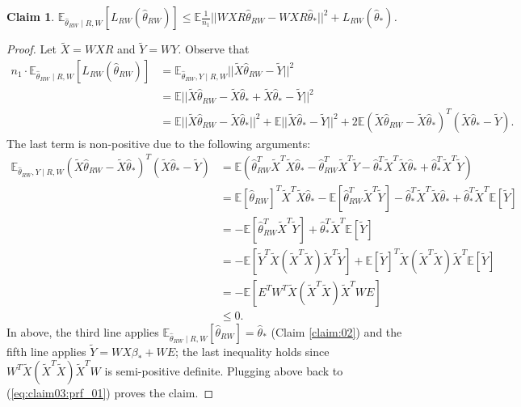\documentclass[a4paper,fleqn]{cas-sc}
\theoremstyle{plain}
\newtheorem{claim}[theorem]{Claim}
\newcommand{\E}{\mathbb{E}}
\newcommand{\tX}{\tilde{X}}
\newcommand{\tY}{\tilde{Y}}
\newcommand{\be}{\beta}
\newcommand{\hte}{\hat{\theta}}
\begin{document}
\begin{claim}
\label{claim:03}
$\E_{\hte_{RW} \mid R,W} 
[L_{RW}(\hte_{RW})] \leq 
\E \frac{1}{n_1} || W XR 
\hte_{RW} - W XR \hte_* ||^2 
+ L_{RW}(\hte_*)$.
\end{claim}
\begin{proof}
Let $\tX = WXR$ and $\tY = WY$. 
Observe that 
\begin{equation}
\label{eq:claim03:prf_01}
\begin{split}
n_1 \cdot \E_{\hte_{RW} \mid R,W} 
[L_{RW}(\hte_{RW})] 
& = \E_{\hte_{RW}, Y \mid R, W} 
||\tX \hte_{RW} - \tY||^2 \\ 
& = \E ||\tX \hte_{RW} - \tX \hte_{*} 
+ \tX \hte_{*} - \tY||^2 \\
& = \E ||\tX \hte_{RW} - \tX \hte_{*} 
||^2 + \E || \tX \hte_{*} - \tY||^2 
+ 2 \E (\tX \hte_{RW} - \tX \hte_{*} )^T 
(\tX \hte_{*} - \tY). 
\end{split}    
\end{equation}
The last term is non-positive due 
to the following arguments: 
\begin{equation}
\begin{split}
\E_{\hte_{RW}, Y \mid R, W} 
(\tX \hte_{RW} - \tX \hte_{*} )^T 
(\tX \hte_{*} - \tY)    
& = \E ( \hte_{RW}^T \tX^T \tX \hte_* 
- \hte_{RW}^T \tX^T \tY
- \hte_{*}^T \tX^T \tX \hte_{*} 
+ \hte_{*}^T \tX^T \tY)\\
& =  \E[\hte_{RW}]^T \tX^T \tX \hte_* 
- \E[ \hte_{RW}^T \tX^T \tY]
- \hte_{*}^T \tX^T \tX \hte_{*} 
+ \hte_{*}^T \tX^T \E[\tY]\\
& = - \E[ \hte_{RW}^T \tX^T \tY] 
+ \hte_{*}^T \tX^T \E[\tY]\\
& = - \E[ \tY^T \tX (\tX^T \tX) 
\tX^T \tY] + \E[\tY]^T \tX (\tX^T 
\tX) \tX^T \E[\tY]\\ 
& = - \E[ E^T W^T \tX (\tX^T \tX) 
\tX^T W E]\\
& \leq 0.
\end{split}
\end{equation}
In above, the third line 
applies $\E_{\hte_{RW} \mid R, W}[\hte_{RW}] = \hte_*$ (Claim 
\ref{claim:02}) and the 
fifth line applies 
$\tY = W X \be_* + WE$; 
the last inequality holds 
since $W^T \tX (\tX^T \tX) 
\tX^T W$ is semi-positive 
definite. Plugging 
above back to (\ref{eq:claim03:prf_01})
proves the claim. 
\end{proof}
\end{document}

